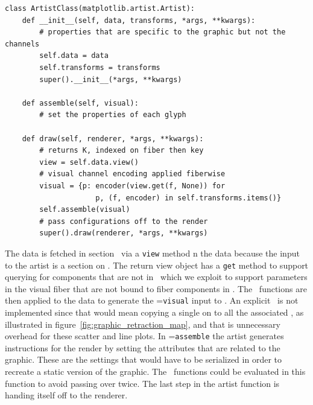 \documentclass[../main.tex]{subfiles}
\begin{document}
\begin{verbatim}
class ArtistClass(matplotlib.artist.Artist):
    def __init__(self, data, transforms, *args, **kwargs):
        # properties that are specific to the graphic but not the channels
        self.data = data 
        self.transforms = transforms
        super().__init__(*args, **kwargs)

    def assemble(self, visual):
        # set the properties of each glyph

    def draw(self, renderer, *args, **kwargs):
        # returns K, indexed on fiber then key 
        view = self.data.view() 
        # visual channel encoding applied fiberwise 
        visual = {p: encoder(view.get(f, None)) for 
                     p, (f, encoder) in self.transforms.items()}
        self.assemble(visual)
        # pass configurations off to the render
        super().draw(renderer, *args, **kwargs)
\end{verbatim}

The data is fetched in section \dsection\ via a \texttt{view} method n the data because the input to the artist is a section on \dtotal. The return view object has a \texttt{get} method to support querying for components that are not in \dfiber\, which we exploit to support parameters in the visual fiber that are not bound to fiber components in \dfiber. The \vchannel\ functions are then applied to the data to generate the \vsection=\texttt{visual} input to \vmark. An explicit \vindex\ is not implemented since that would mean copying a single \vsection on \dbasepoint to all the associated \gbasepoint, as illustrated in figure~\ref{fig:graphic_retraction_map}, and that is unnecessary overhead for these scatter and line plots. In \vmarkd=\texttt{assemble} the artist generates instructions for the render by setting  the attributes that are related to the graphic. These are the settings that would have to be serialized in order to recreate a static version of the graphic. The \vchannel\ functions could be evaluated in this function to avoid passing over \dbase twice. The last step in the artist function is handing itself off to the renderer. 
\end{document}
